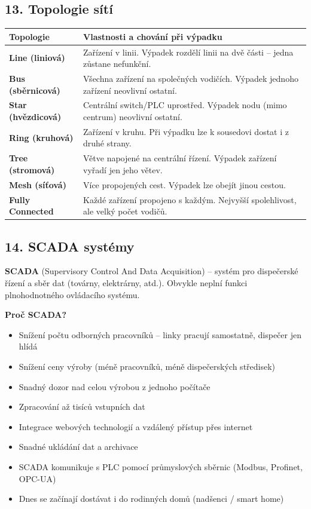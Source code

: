 \documentclass[a4paper,10pt]{article}
\begin{document}
\begin{vysvetlenibox}
\subsection*{13. Topologie sítí}

\begin{center}
\begin{tabularx}{0.97\linewidth}{@{} l X @{}}
\toprule
\textbf{Topologie} & \textbf{Vlastnosti a chování při výpadku} \\
\midrule
\textbf{Line (liniová)} & Zařízení v linii. Výpadek rozdělí linii na dvě části – jedna zůstane nefunkční. \\
\textbf{Bus (sběrnicová)} & Všechna zařízení na společných vodičích. Výpadek jednoho zařízení neovlivní ostatní. \\
\textbf{Star (hvězdicová)} & Centrální switch/PLC uprostřed. Výpadek nodu (mimo centrum) neovlivní ostatní. \\
\textbf{Ring (kruhová)} & Zařízení v kruhu. Při výpadku lze k sousedovi dostat i z druhé strany. \\
\textbf{Tree (stromová)} & Větve napojené na centrální řízení. Výpadek zařízení vyřadí jen jeho větev. \\
\textbf{Mesh (síťová)} & Více propojených cest. Výpadek lze obejít jinou cestou. \\
\textbf{Fully Connected} & Každé zařízení propojeno s každým. Nejvyšší spolehlivost, ale velký počet vodičů. \\
\bottomrule
\end{tabularx}
\end{center}

\subsection*{14. SCADA systémy}

\textbf{SCADA} (Supervisory Control And Data Acquisition) – systém pro dispečerské řízení a sběr dat (továrny, elektrárny, atd.). Obvykle neplní funkci plnohodnotného ovládacího systému.

\textbf{Proč SCADA?}
\begin{itemize}
  \item Snížení počtu odborných pracovníků – linky pracují samostatně, dispečer jen hlídá
  \item Snížení ceny výroby (méně pracovníků, méně dispečerských středisek)
  \item Snadný dozor nad celou výrobou z jednoho počítače
  \item Zpracování až tisíců vstupních dat
  \item Integrace webových technologií a vzdálený přístup přes internet
  \item Snadné ukládání dat a archivace
  \item SCADA komunikuje s PLC pomocí průmyslových sběrnic (Modbus, Profinet, OPC-UA)
  \item Dnes se začínají dostávat i do rodinných domů (nadšenci / smart home)
\end{itemize}


\end{vysvetlenibox}
\end{document}
